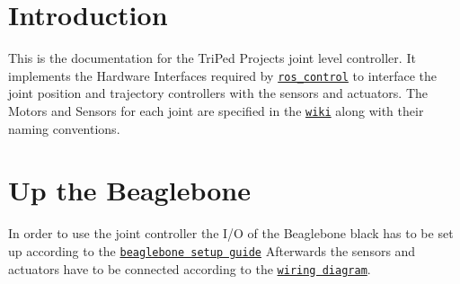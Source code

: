 \hypertarget{index_Introduction}{}\section{Introduction}\label{index_Introduction}
This is the documentation for the Tri\+Ped Projects joint level controller. It implements the Hardware Interfaces required by \href{http://wiki.ros.org/ros_control}{\tt ros\+\_\+control} to interface the joint position and trajectory controllers with the sensors and actuators. The Motors and Sensors for each joint are specified in the \href{https://github.com/TriPed-Robot/Wiki/wiki/One-Legged-Sub-Robot}{\tt wiki} along with their naming conventions.\hypertarget{index_Setting}{}\section{Up the Beaglebone}\label{index_Setting}
In order to use the joint controller the I/O of the Beaglebone black has to be set up according to the \href{https://github.com/TriPed-Robot/Wiki/wiki/Beaglebone-Setup}{\tt beaglebone setup guide} Afterwards the sensors and actuators have to be connected according to the \href{https://github.com/TriPed-Robot/Wiki/wiki/Wiring-diagram}{\tt wiring diagram}. 